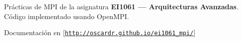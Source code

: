 Prácticas de M\-P\-I de la asignatura {\bfseries E\-I1061 — Arquitecturas Avanzadas}. Código implementado usando Open\-M\-P\-I.

Documentación en \mbox{[}\href{http://oscardr.github.io/ei1061_mpi/}{\tt http\-://oscardr.\-github.\-io/ei1061\-\_\-mpi/}\mbox{]} 